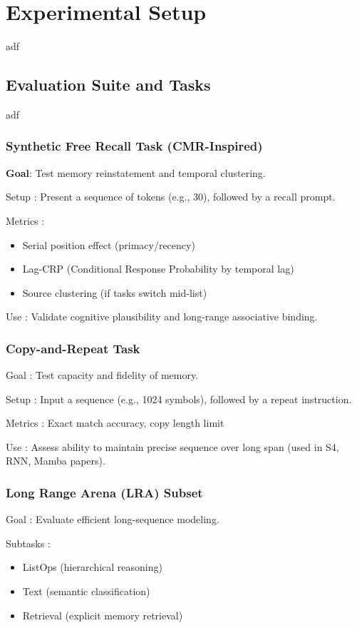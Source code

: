 \section{Experimental Setup}
adf

\subsection{Evaluation Suite and Tasks}
adf

\subsubsection{Synthetic Free Recall Task (CMR-Inspired)}
\textbf{Goal}: Test memory reinstatement and temporal clustering.

Setup : Present a sequence of tokens (e.g., 30), followed by a recall prompt.

Metrics :
\begin{itemize}
\item Serial position effect (primacy/recency)
\item Lag-CRP (Conditional Response Probability by temporal lag)
\item Source clustering (if tasks switch mid-list)
\end{itemize}

Use : Validate cognitive plausibility and long-range associative binding.

\subsubsection{Copy-and-Repeat Task}
Goal : Test capacity and fidelity of memory.

Setup : Input a sequence (e.g., 1024 symbols), followed by a repeat instruction.

Metrics : Exact match accuracy, copy length limit

Use : Assess ability to maintain precise sequence over long span (used in S4, RNN, Mamba papers).

\subsubsection{Long Range Arena (LRA) Subset}
Goal : Evaluate efficient long-sequence modeling.

Subtasks :
\begin{itemize}
\item ListOps (hierarchical reasoning)
\item Text (semantic classification)
\item Retrieval (explicit memory retrieval)
\end{itemize}

